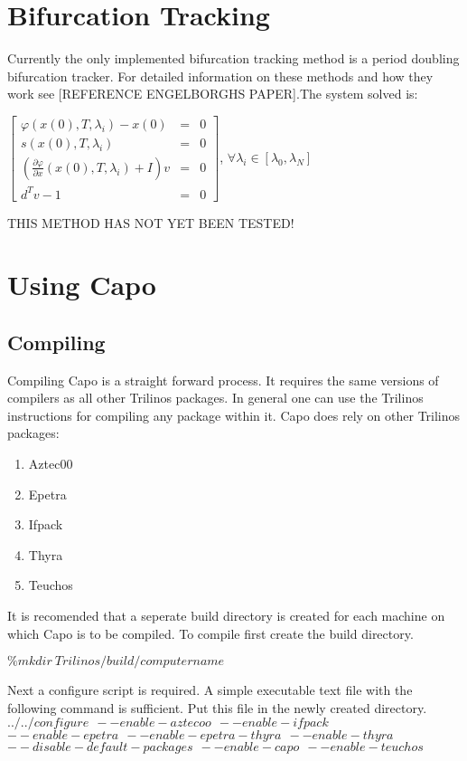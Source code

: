 \documentclass[11pt]{article}
\begin{document}
\section{Bifurcation Tracking}
Currently the only implemented bifurcation tracking method is 
a period doubling bifurcation tracker.   For detailed
information on these methods and how they work see 
[REFERENCE ENGELBORGHS PAPER].The system solved is:
\begin{center}
$\left[
\begin{array}{ccc}
\varphi(x(0),T,\lambda_i)-x(0)&=&0\\
s(x(0),T,\lambda_i)&=&0\\
(\frac{\partial\varphi}{\partial x}(x(0),T,\lambda_i)+I)v&=&0\\
d^Tv-1&=&0
\end{array}\right]
$,
$\forall \lambda_i \in [\lambda_0,\lambda_N]$
\end{center}
THIS METHOD HAS NOT YET BEEN TESTED!
\section{Using Capo}

\subsection{Compiling}
Compiling Capo is a straight forward process.  It requires the same
versions of compilers as all other Trilinos packages.  In general one 
can use the Trilinos instructions for compiling any package within
it.  Capo does rely on other Trilinos packages:
\begin{enumerate}
\item Aztec00
\item Epetra
\item Ifpack
\item Thyra
\item Teuchos
\end{enumerate}

It is recomended that a seperate build directory is created for each
machine on which Capo is to be compiled.  To compile first create the
build directory.
\begin{center}
$\%mkdir\ Trilinos/build/computername$
\end{center}
Next a configure script is required.  A simple executable text
file with the following command is sufficient.  Put this file
in the newly created directory.\\
$../../configure\ \ --enable-aztecoo\ \ --enable-ifpack$\\
$--enable-epetra\ \ --enable-epetra-thyra\ \ --enable-thyra$\\
$--disable-default-packages\ \ --enable-capo\ \ --enable-teuchos$\\
\end{document}
